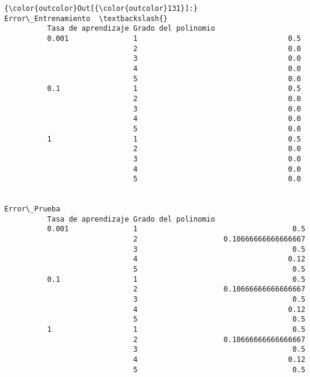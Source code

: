 \documentclass[11pt]{article}
\begin{document}
\begin{Verbatim}[commandchars=\\\{\}]
{\color{outcolor}Out[{\color{outcolor}131}]:}                                         Error\_Entrenamiento  \textbackslash{}
          Tasa de aprendizaje Grado del polinomio                       
          0.001               1                                   0.5   
                              2                                   0.0   
                              3                                   0.0   
                              4                                   0.0   
                              5                                   0.0   
          0.1                 1                                   0.5   
                              2                                   0.0   
                              3                                   0.0   
                              4                                   0.0   
                              5                                   0.0   
          1                   1                                   0.5   
                              2                                   0.0   
                              3                                   0.0   
                              4                                   0.0   
                              5                                   0.0   
          
                                                          Error\_Prueba  
          Tasa de aprendizaje Grado del polinomio                       
          0.001               1                                    0.5  
                              2                    0.10666666666666667  
                              3                                    0.5  
                              4                                   0.12  
                              5                                    0.5  
          0.1                 1                                    0.5  
                              2                    0.10666666666666667  
                              3                                    0.5  
                              4                                   0.12  
                              5                                    0.5  
          1                   1                                    0.5  
                              2                    0.10666666666666667  
                              3                                    0.5  
                              4                                   0.12  
                              5                                    0.5  
\end{Verbatim}
            
\end{document}
